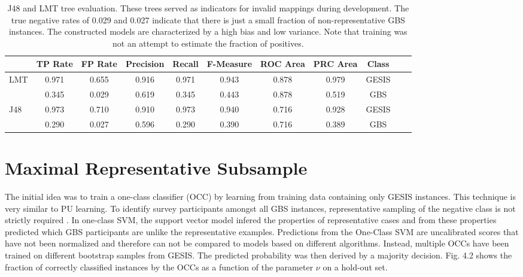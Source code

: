 \vspace{0.33cm}
\begin{table}[ht]
    \begin{center}
		\captionsetup{width= 430pt}
            {\footnotesize
            \begin{tabular}{l|cccccccccc}
                \hline \hline
                           &  TP Rate & FP Rate & Precision & Recall & F-Measure & ROC Area & PRC Area & Class \\
                \hline
                      LMT & 0.971 & 0.655 & 0.916 & 0.971 & 0.943 & 0.878 & 0.979 & GESIS\\
                      & 0.345 & 0.029 & 0.619 & 0.345 & 0.443 & 0.878 & 0.519 & GBS\\
                \hline \hline
    		 J48 & 0.973 & 0.710 & 0.910 & 0.973 & 0.940 & 0.716 & 0.928 & GESIS\\
                      & 0.290 & 0.027 & 0.596 & 0.290 & 0.390 & 0.716 & 0.389 & GBS\\
\end{tabular}}
        \caption{J48 and LMT tree evaluation. These trees served as indicators for invalid mappings during development. The true negative rates of 0.029 and 0.027 indicate that there is just a small fraction of non-representative GBS instances. The constructed models are characterized by a high bias and low variance. Note that training was not an attempt to estimate the fraction of positives.}
\end{center}
\end{table}

\section{Maximal Representative Subsample}

The initial idea was to train a one-class classifier (OCC) by learning from training data containing only GESIS instances. This technique is very similar to PU learning. To identify survey participants amongst all GBS instances, representative sampling of the negative class is not strictly required \cite{tax}. In one-class SVM, the support vector model infered the properties of representative cases and from these properties predicted which GBS participants are unlike the representative examples. Predictions from the One-Class SVM are uncalibrated scores that have not been normalized and therefore can not be compared to models based on different algorithms. Instead, multiple OCCs have been trained on different  bootstrap samples from GESIS. The predicted probability was then derived by a majority decision. Fig. 4.2 shows the fraction of correctly classified instances by the OCCs as a function of the parameter \(\nu\) on a hold-out set.

